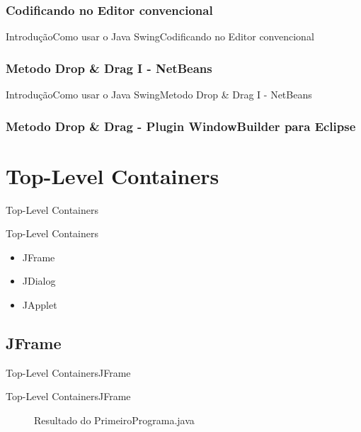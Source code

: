 \documentclass[10pt]{beamer}
\begin{document}
\subsubsection{Codificando no Editor convencional}
\begin{frame}{Introdução}{Como usar o Java Swing}{Codificando no Editor convencional}

\end{frame}{}
\subsubsection{Metodo Drop \& Drag I - NetBeans}
\begin{frame}{Introdução}{Como usar o Java Swing}{Metodo Drop \& Drag I - NetBeans}
\end{frame}{}
\subsubsection{Metodo Drop \& Drag - Plugin WindowBuilder para Eclipse}
\begin{frame}
\end{frame}{}


			
\section{Top-Level Containers}
\begin{frame}{Top-Level Containers}{}
\end{frame}{}
\begin{frame}{Top-Level Containers}
\begin{itemize}
\item JFrame
\item JDialog
\item JApplet
\end{itemize}
\end{frame}{}

\subsection{JFrame}
\begin{frame}{Top-Level Containers}{JFrame}

\end{frame}{}
\begin{frame}{Top-Level Containers}{JFrame}
\begin{figure}[!htb]
    \centering
    \caption{Resultado do PrimeiroPrograma.java}
    \label{figRotulo}
  \end{figure}
\end{frame}{}
\end{document}
